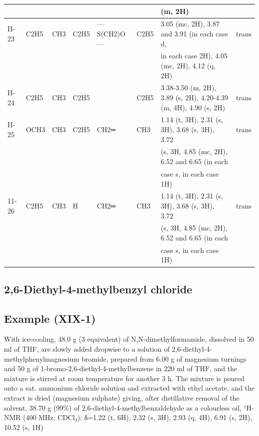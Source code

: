\documentclass[11pt,a4paper]{article}
\begin{document}
\begin{table}[h]
\begin{tabular}{|l|l|l|l|l|l|l|l|}
 &  &  &  &  &  & (m, 2H) &  \\ \hline
II-23 & C2H5 & CH3 & C2H5 & —S(CH2)O— & C2H5 & 3.05 (mc, 2H), 3.87 and 3.91 (in each case d, & trans \\ \hline
 &  &  &  &  &  & in each case 2H), 4.05 (mc, 2H), 4.12 (q, 2H) &  \\ \hline
II-24 & C2H5 & CH3 & C2H5 &  & C2H5 & 3.38-3.50 (m, 2H), 3.89 (s, 2H), 4.20-4.39 (m, 4H), 4.90 (s, 2H) & trans \\ \hline
II-25 & OCH3 & CH3 & C2H5 & CH2═ & CH3 & 1.14 (t, 3H), 2.31 (s, 3H), 3.68 (s, 3H), 3.72 & trans \\ \hline
 &  &  &  &  &  & (s, 3H, 4.85 (mc, 2H), 6.52 and 6.65 (in each &  \\ \hline
 &  &  &  &  &  & case s, in each case 1H) &  \\ \hline
11-26 & C2H5 & CH3 & H & CH2═ & CH3 & 1.14 (t, 3H), 2.31 (s, 3H), 3.68 (s, 3H), 3.72 & trans \\ \hline
 &  &  &  &  &  & (s, 3H, 4.85 (mc, 2H), 6.52 and 6.65 (in each &  \\ \hline
 &  &  &  &  &  & case s, in each case 1H) &  \\ \hline
\end{tabular}
\end{table}

\subsection{2,6-Diethyl-4-methylbenzyl chloride}

\subsection{Example (XIX-1)}

With ice-cooling, 48.0 g (3 equivalent) of N,N-dimethylformamide, dissolved in 50 ml of THF, are slowly added dropwise to a solution of 2,6-diethyl-4-methylphenylmagnesium bromide, prepared from 6.00 g of magnesium turnings and 50 g of 1-bromo-2,6-diethyl-4-methylbenzene in 220 ml of THF, and the mixture is stirred at room temperature for another 3 h. The mixture is poured onto a sat. ammonium chloride solution and extracted with ethyl acetate, and the extract is dried (magnesium sulphate) giving, after distillative removal of the solvent, 38.70 g (99\%) of 2,6-diethyl-4-methylbenzaldehyde as a colourless oil, ¹H-NMR (400 MHz, CDCl₃): δ=1.22 (t, 6H), 2.32 (s, 3H), 2.93 (q, 4H), 6.91 (s, 2H), 10.52 (s, 1H)
\end{document}
